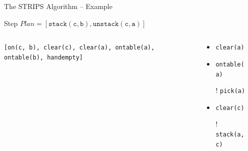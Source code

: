 \documentclass[presentation]{beamer}\mode<presentation>{\usetheme{AMSBolognaFC}}
\begin{document}
\begin{frame}[c]{The STRIPS Algorithm -- Example}
\small

\begin{exampleblock}{Step \nextStripsExampleStep{} \hfill $Plan = [\mathtt{stack(c,b),unstack(c,a)}]$}
    \begin{columns}[t]
        \begin{column}{.30\linewidth}\centering
            \texttt{[on(c, b), clear(c), \alert{clear(a)}, ontable(a), ontable(b), handempty]}
        \end{column}
        \begin{column}{.50\linewidth}\centering
            \begin{itemize}
                \item \alert{\texttt{clear(a)}}
                \item \texttt{ontable(a)}
                \item[!] \texttt{pick(a)}
                \item \texttt{clear(c)}
                \item[!] \texttt{stack(a,c)}
            \end{itemize}
        \end{column}
        \begin{column}{.10\linewidth}\centering
            
        \end{column}
    \end{columns}
\end{exampleblock}

\end{frame}
\end{document}
